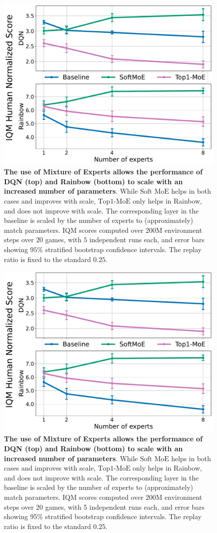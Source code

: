 \documentclass{article}
\theoremstyle{plain}
\theoremstyle{definition}
\theoremstyle{remark}
\newcommand{\moe}{$\textrm{Top1-MoE}$}
\newcommand{\softmoe}{$\textrm{Soft MoE}$}
\begin{document}
\ifarxiv
  \begin{figure}[!t]
    \centering
    \includegraphics[width=0.6\linewidth]{figures/combinedTopline.pdf}
    \caption{{\bf The use of Mixture of Experts allows the performance of DQN (top) and Rainbow (bottom) to scale with an increased number of parameters}. While \softmoe{} helps in both cases and improves with scale, \moe{} only helps in Rainbow, and does not improve with scale. The corresponding layer in the baseline is scaled by the number of experts to (approximately) match parameters. IQM scores computed over 200M environment steps over $20$ games, with $5$ independent runs each, and error bars showing $95\%$ stratified bootstrap confidence intervals. The replay ratio is fixed to the standard $0.25$.}
    \label{fig:topline}%
  \end{figure}
\else
  \begin{figure}[!t]
    \centering
    \includegraphics[width=\linewidth]{figures/combinedTopline.pdf}
    \caption{{\bf The use of Mixture of Experts allows the performance of DQN (top) and Rainbow (bottom) to scale with an increased number of parameters}. While \softmoe{} helps in both cases and improves with scale, \moe{} only helps in Rainbow, and does not improve with scale. The corresponding layer in the baseline is scaled by the number of experts to (approximately) match parameters. IQM scores computed over 200M environment steps over 20 games, with 5 independent runs each, and error bars showing 95\% stratified bootstrap confidence intervals. The replay ratio is fixed to the standard $0.25$.}
    \label{fig:topline}%

  \end{figure}
\fi
\end{document}
